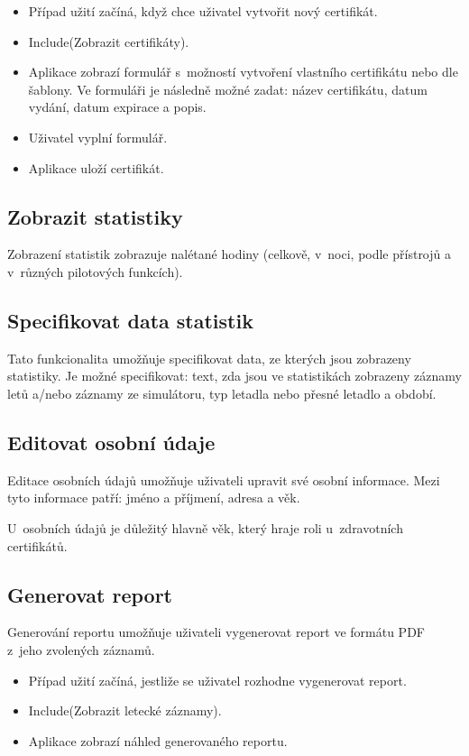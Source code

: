 \documentclass[thesis=M,czech]{FITthesis}[2012/06/26]
\begin{document}
\begin{itemize}
\item Případ užití začíná, když chce uživatel vytvořit nový certifikát.
\item Include(Zobrazit certifikáty).
\item Aplikace zobrazí formulář s~možností vytvoření vlastního certifikátu nebo dle šablony. Ve formuláři je následně možné zadat: název certifikátu, datum vydání, datum expirace a popis.
\item Uživatel vyplní formulář.
\item Aplikace uloží certifikát.
\end{itemize}

\subsection{Zobrazit statistiky}
Zobrazení statistik zobrazuje nalétané hodiny (celkově, v~noci, podle přístrojů a v~různých pilotových funkcích).

\subsection{Specifikovat data statistik}
Tato funkcionalita umožňuje specifikovat data, ze kterých jsou zobrazeny statistiky.
Je možné specifikovat: text, zda jsou ve statistikách zobrazeny záznamy letů a/nebo záznamy ze simulátoru, typ letadla nebo přesné letadlo a období.

\subsection{Editovat osobní údaje}
Editace osobních údajů umožňuje uživateli upravit své osobní informace. Mezi tyto informace patří: jméno a příjmení, adresa a věk.

U~osobních údajů je důležitý hlavně věk, který hraje roli u~zdravotních certifikátů.

\subsection{Generovat report}
Generování reportu umožňuje uživateli vygenerovat report ve formátu PDF z~jeho zvolených záznamů.

\begin{itemize}
\item Případ užití začíná, jestliže se uživatel rozhodne vygenerovat report.
\item Include(Zobrazit letecké záznamy).
\item Aplikace zobrazí náhled generovaného reportu.
\end{itemize}
\end{document}
